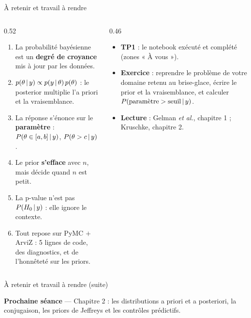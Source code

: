 \begin{frame}{À retenir et travail à rendre}
\begin{columns}[t]
\begin{column}{0.52\textwidth}
\begin{kbox}
\begin{enumerate}
  \item La probabilité bayésienne est un \textbf{degré de croyance} mis à jour
        par les données.
  \item $p(\theta \,\vert\, y) \propto p(y \,\vert\, \theta)\,p(\theta)$ : le posterior
        multiplie l'a priori et la vraisemblance.
  \item La réponse s'énonce sur le \textbf{paramètre} :
        $P(\theta \in [a,b] \,\vert\, y)$, $P(\theta > c \,\vert\, y)$.
  \item Le prior \textbf{s'efface} avec $n$, mais décide quand $n$ est petit.
  \item La p-value n'est pas $P(H_0 \,\vert\, y)$ : elle ignore le contexte.
  \item Tout repose sur PyMC $+$ ArviZ : 5 lignes de code, des diagnostics,
        et de l'honnêteté sur les priors.
\end{enumerate}
\end{kbox}
\end{column}
\begin{column}{0.46\textwidth}
\begin{abox}
\begin{itemize}
  \item \textbf{TP1} : le notebook 
        exécuté et complété (zones « À vous »).
  \item \textbf{Exercice} : reprendre le problème de votre domaine retenu
        au brise-glace, écrire le prior et la vraisemblance, et calculer
        $P(\text{paramètre} > \text{seuil} \,\vert\, y)$.
  \item \textbf{Lecture} : Gelman \emph{et al.}, chapitre 1 ;
        Kruschke, chapitre 2.
\end{itemize}
\end{abox}
\end{column}
\end{columns}
\end{frame}

\begin{frame}{À retenir et travail à rendre (suite)}
\begin{tcolorbox}[colback=byDeep!8,colframe=byDeep!50,arc=2mm]
\centering\small
\textbf{Prochaine séance} --- Chapitre 2 : les distributions a priori et
a posteriori, la conjugaison, les priors de Jeffreys et les contrôles prédictifs.
\end{tcolorbox}

\end{frame}
